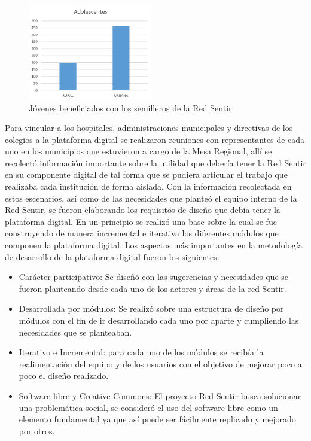 \documentclass[journal,transmag]{IEEEtran}
\begin{document}
\begin{figure}[tbp]
\centering
\includegraphics[width=0.48\textwidth]{Jovenes.png}
\caption{Jóvenes beneficiados con los semilleros de la Red Sentir.}
\label{fig:rural_urbano}
\end{figure}

Para vincular a los hospitales, administraciones municipales y directivas de los colegios a la plataforma digital se realizaron reuniones con representantes de cada uno en los municipios que estuvieron a cargo de la Mesa Regional, allí se recolectó información importante sobre la utilidad que debería tener la Red Sentir en su componente digital de tal forma que se pudiera articular el trabajo que realizaba cada institución de forma aislada. Con la información recolectada en estos escenarios, así como de las necesidades que planteó el equipo interno de la Red Sentir, se fueron elaborando los requisitos de diseño que debía tener la plataforma digital. En un principio se realizó una base sobre la cual se fue construyendo de manera incremental e iterativa los diferentes módulos que componen la plataforma digital. Los aspectos más importantes en la metodología de desarrollo de la plataforma digital fueron los siguientes:

\begin{itemize}
\item Carácter participativo: Se diseñó con las sugerencias y necesidades que se fueron planteando desde cada uno de los actores y áreas de la red Sentir.

\item Desarrollada por módulos: Se realizó sobre una estructura de diseño por módulos con el fin de ir desarrollando cada uno por aparte y cumpliendo las necesidades que se planteaban.

\item Iterativo e Incremental: para cada uno de los módulos se recibía la realimentación del equipo y de los usuarios con el objetivo de mejorar poco a poco el diseño realizado.

\item Software libre y Creative Commons: El proyecto Red Sentir busca solucionar una problemática social, se consideró el uso del software libre como un elemento fundamental ya que así puede ser fácilmente replicado y mejorado por otros.
\end{itemize}
\end{document}
